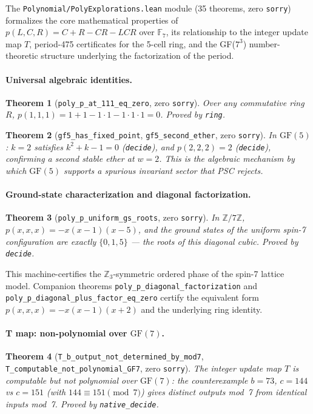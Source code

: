 \documentclass[11pt,a4paper]{article}
\newtheorem{theorem}{Theorem}[section]
\theoremstyle{definition}
\begin{document}
The \texttt{Polynomial/PolyExplorations.lean} module (35 theorems, zero \lstinline|sorry|)
formalizes the core mathematical properties of $p(L,C,R)=C+R-CR-LCR$ over $\mathbb{F}_7$,
its relationship to the integer update map $T$, period-475 certificates for the 5-cell ring,
and the GF($7^3$) number-theoretic structure underlying the factorization of the period.

\paragraph{Universal algebraic identities.}
\begin{theorem}[\lstinline|poly_p_at_111_eq_zero|, zero \texttt{sorry}]
Over any commutative ring $R$, $p(1,1,1)=1+1-1\cdot1-1\cdot1\cdot1=0$.
Proved by \lstinline|ring|.
\end{theorem}

\begin{theorem}[\lstinline|gf5_has_fixed_point|, \lstinline|gf5_second_ether|, zero \texttt{sorry}]
In $\mathrm{GF}(5)$: $k=2$ satisfies $k^2+k-1=0$ (\lstinline|decide|), and $p(2,2,2)=2$
(\lstinline|decide|), confirming a second stable ether at $w=2$.  This is the algebraic
mechanism by which $\mathrm{GF}(5)$ supports a spurious invariant sector that PSC rejects.
\end{theorem}

\paragraph{Ground-state characterization and diagonal factorization.}
\begin{theorem}[\lstinline|poly_p_uniform_gs_roots|, zero \texttt{sorry}]
In $\mathbb{Z}/7\mathbb{Z}$, $p(x,x,x)=-x(x-1)(x-5)$, and the ground states of the
uniform spin-7 configuration are exactly $\{0,1,5\}$ --- the roots of this diagonal cubic.
Proved by \lstinline|decide|.
\end{theorem}

This machine-certifies the $\mathbb{Z}_3$-symmetric ordered phase of the spin-7 lattice model.
Companion theorems \lstinline|poly_p_diagonal_factorization| and
\lstinline|poly_p_diagonal_plus_factor_eq_zero| certify the equivalent form
$p(x,x,x)=-x(x-1)(x+2)$ and the underlying ring identity.

\paragraph{T map: non-polynomial over $\mathrm{GF}(7)$.}
\begin{theorem}[\lstinline|T_b_output_not_determined_by_mod7|, \lstinline|T_computable_not_polynomial_GF7|, zero \texttt{sorry}]
The integer update map $T$ is computable but not polynomial over $\mathrm{GF}(7)$:
the counterexample $b=73$, $c=144$ vs $c=151$ (with $144\equiv 151\pmod7$) gives
distinct outputs mod~7 from identical inputs mod~7.  Proved by \lstinline|native_decide|.
\end{theorem}
\end{document}
